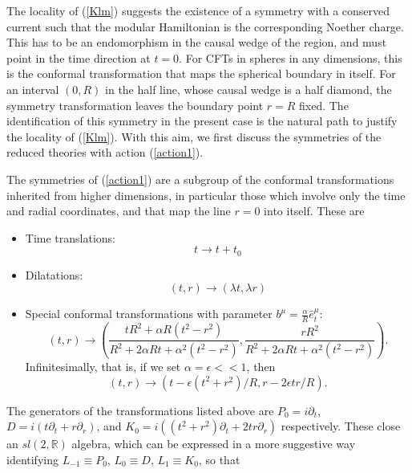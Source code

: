 \documentclass[12pt,a4paper]{article}
\begin{document}
The locality of (\ref{Klm}) suggests the existence of a symmetry with a conserved current such that the modular Hamiltonian is the corresponding Noether charge. This has to be an endomorphism in the causal wedge of the region, and must point in the time direction at $t=0$. For CFTs in spheres in any dimensions, this is the conformal transformation that maps the spherical boundary in itself. For an interval $(0,R)$ in the half line, whose causal wedge is a half diamond, the symmetry transformation leaves the boundary point $r=R$ fixed. The identification of this symmetry in the present case is the natural path to justify the locality of (\ref{Klm}). With this aim, we first discuss the symmetries of the reduced theories with action (\ref{action1}).

The symmetries of (\ref{action1}) are a subgroup of the conformal transformations inherited from higher dimensions, in particular those which involve only the time and radial coordinates, and that map the line $r=0$ into itself. These are
\begin{itemize}
\item Time translations: 
\begin{equation}\label{translation}
t\rightarrow t + t_0
\end{equation}

\item Dilatations:
\begin{equation}
(t,r)\rightarrow (\lambda t, \lambda r)
\end{equation}

\item Special conformal transformations with parameter $b^{\mu}= \frac{\alpha}{R}\hat{e}^{\mu}_t$:
\begin{equation}\label{STC}
(t,r)\rightarrow \left(\frac{t R^2+\alpha R(t^2-r^2)}{R^2+2\alpha R t+\alpha^2 (t^2-r^2)}, \frac{r R^2}{R^2+2\alpha R t+\alpha^2(t^2-r^2)}\right).
\end{equation}
Infinitesimally, that is, if we set $\alpha= \epsilon<<1$, then 
\begin{equation}
(t,r)\rightarrow  \left( t- \epsilon (t^2+r^2)/R,r-2\epsilon t r/R\right).
\end{equation}
\end{itemize}
The generators of the transformations listed above are $P_0=i\partial_t$, $D=i (t\partial_t+r\partial_r)$, and $K_0=i\left((t^2+r^2)\partial_t+2 t r\partial_r\right)$ respectively. These close an $sl(2, \mathbb{R})$ algebra, which can be expressed in a more suggestive way identifying $L_{-1}\equiv P_0$, $L_0\equiv D$, $L_1\equiv K_0$, so that
\end{document}
